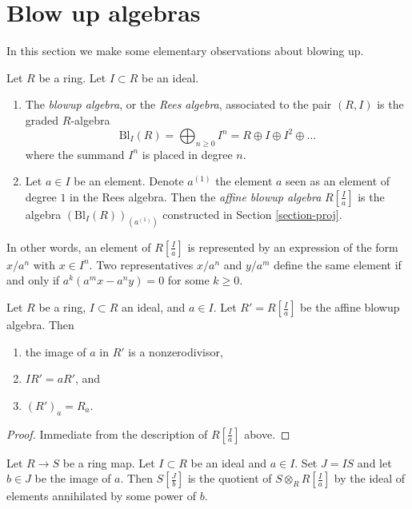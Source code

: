 \section{Blow up algebras}
\label{section-blow-up}

\noindent
In this section we make some elementary observations about blowing up.

\begin{definition}
\label{definition-blow-up}
Let $R$ be a ring.
Let $I \subset R$ be an ideal.
\begin{enumerate}
\item The {\it blowup algebra}, or the {\it Rees algebra}, associated to
the pair $(R, I)$ is the graded $R$-algebra
$$
\text{Bl}_I(R) =
\bigoplus\nolimits_{n \geq 0} I^n =
R \oplus I \oplus I^2 \oplus \ldots
$$
where the summand $I^n$ is placed in degree $n$.
\item Let $a \in I$ be an element. Denote $a^{(1)}$ the element $a$
seen as an element of degree $1$ in the Rees algebra. Then the
{\it affine blowup algebra} $R[\frac{I}{a}]$ is the algebra
$(\text{Bl}_I(R))_{(a^{(1)})}$ constructed in Section \ref{section-proj}.
\end{enumerate}
\end{definition}

\noindent
In other words, an element of $R[\frac{I}{a}]$ is represented by
an expression of the form $x/a^n$ with $x \in I^n$. Two representatives
$x/a^n$ and $y/a^m$ define the same element if and only if
$a^k(a^mx - a^ny) = 0$ for some $k \geq 0$.

\begin{lemma}
\label{lemma-affine-blowup}
Let $R$ be a ring, $I \subset R$ an ideal, and $a \in I$.
Let $R' = R[\frac{I}{a}]$ be the affine blowup algebra. Then
\begin{enumerate}
\item the image of $a$ in $R'$ is a nonzerodivisor,
\item $IR' = aR'$, and
\item $(R')_a = R_a$.
\end{enumerate}
\end{lemma}

\begin{proof}
Immediate from the description of $R[\frac{I}{a}]$ above.
\end{proof}

\begin{lemma}
\label{lemma-blowup-base-change}
Let $R \to S$ be a ring map. Let $I \subset R$ be an ideal
and $a \in I$. Set $J = IS$ and let $b \in J$ be the image of $a$.
Then $S[\frac{J}{b}]$ is the quotient of $S \otimes_R R[\frac{I}{a}]$
by the ideal of elements annihilated by some power of $b$.
\end{lemma}

